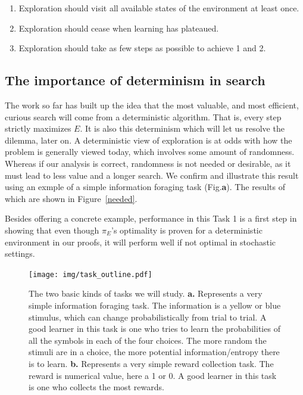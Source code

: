 \begin{enumerate}
	\item Exploration should visit all available states of the environment at least once.
	\item Exploration should cease when learning has plateaued.
	\item Exploration should take as few steps as possible to achieve 1 and 2.
\end{enumerate}

\subsection{The importance of determinism in search}
The work so far has built up the idea that the most valuable, and most efficient, curious search will come from a deterministic algorithm. That is, every step strictly maximizes $E$. It is also this determinism which will let us resolve the dilemma, later on. A deterministic view of exploration is at odds with how the problem is generally viewed today, which involves some amount of randomness. Whereas if our analysis is correct, randomness is not needed or desirable, as it must lead to less value and a longer search. We confirm and illustrate this result using an exmple of a simple information foraging task (Fig.\label{fig:task_outline}\textbf{a}). The results of which are shown in Figure~\ref{needed}. 

Besides offering a concrete example, performance in this Task 1 is a first step in showing that even though $\pi_E$'s optimality is proven for a deterministic environment in our proofs, it will perform well if not optimal in stochastic settings.

\begin{figure}
	\begin{fullwidth}
	\texttt{[image: img/task\_outline.pdf]} 
	\caption{The two basic kinds of tasks we will study.	
\textbf{a.} Represents a very simple information foraging task. The information is a yellow or blue stimulus, which can change probabilistically from trial to trial. A good learner in this task is one who tries to learn the probabilities of all the symbols in each of the four choices. The more random the stimuli are in a choice, the more potential information/entropy there is to learn.  
	\textbf{b.} Represents a very simple reward collection task. The reward is numerical value, here a 1 or 0. A good learner in this task is one who collects the most rewards.}
	\label{fig:task_outline} 
	\end{fullwidth}
\end{figure}

